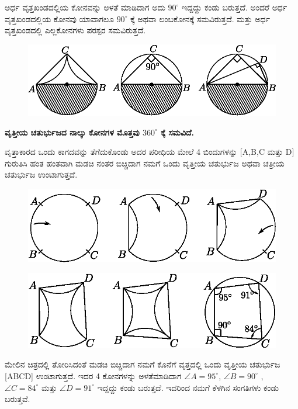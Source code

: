 \begin{itemize}
 ಅರ್ಧ  ವೃತ್ತಖಂಡದಲ್ಲಿಯ ಕೋನವನ್ನು ಅಳತೆ ಮಾಡಿದಾಗ ಅದು $90^\circ$ ಇದ್ದದ್ದು ಕಂಡು ಬರುತ್ತದೆ. ಅಂದರೆ ಅರ್ಧ ವೃತ್ತಖಂಡದಲ್ಲಿಯ ಕೋನವು ಯಾವಾಗಲೂ $90^\circ$ ಕ್ಕೆ ಅಥವಾ ಲಂಬಕೋನಕ್ಕೆ ಸಮವಿರುತ್ತದೆ. ಮತ್ತು ಅರ್ಧ ವೃತ್ತಖಂಡದಲ್ಲಿ ಎಲ್ಲಕೋನಗಳು ಪರಸ್ಪರ ಸಮವಿರುತ್ತದೆ. 
   \begin{figure}[H]
\centering
\includegraphics[scale=.98]{src/figure/chap1/fig1-31b.eps}
\end{figure}
  \end{itemize}
   
   \medskip
   \noindent
   \textbf{ವೃತ್ತೀಯ ಚತುರ್ಭುಜದ ನಾಲ್ಕು ಕೋನಗಳ ಮೊತ್ತವು $360^\circ$ ಕ್ಕೆ ಸಮವಿದೆ.}
   
   ವೃತ್ತಾಕಾರದ ಒಂದು ಕಾಗದವನ್ನು ತೆಗೆದುಕೊಂಡು ಅದರ ಪರೀಧಿಯ ಮೇಲೆ 4 ಬಿಂದುಗಳನ್ನು [A,B,C ಮತ್ತು  D] ಗುರುತಿಸಿ ಹಂತ ಹಂತವಾಗಿ ಮಡಚಿ ನಂತರ ಬಿಚ್ಚಿದಾಗ ನಮಗೆ ಒಂದು ವೃತ್ತೀಯ ಚತುರ್ಭುಜ ಅಥವಾ ಚತ್ರೀಯ ಚತುರ್ಭುಜ ಉಂಟಾಗುತ್ತದೆ. 
      \begin{figure}[H]
\centering
\includegraphics[scale=.98]{src/figure/chap1/fig1-32a.eps}
\end{figure}
      \begin{figure}[H]
\centering
\includegraphics[scale=.98]{src/figure/chap1/fig1-32b.eps}
\end{figure}
 
 ಮೇಲಿನ ಚಿತ್ರದಲ್ಲಿ ತೋರಿಸಿದಂತೆ ಮಡಚಿ ಬಿಚ್ಚಿದಾಗ ನಮಗೆ ಕೊನೆಗೆ ವೃತ್ತದಲ್ಲಿ ಒಂದು ವೃತ್ತೀಯ ಚತುರ್ಭುಜ [ABCD] ಉಂಟಾಗುತ್ತದೆ. ಇದರ 4 ಕೋನಗಳನ್ನು ಅಳತೆಮಾಡಿದಾಗ  $\angle A = 95^\circ$, $\angle B = 90^\circ$ , $\angle C = 84^\circ$ ಮತ್ತು $\angle D = 91^\circ$ ಇದ್ದದ್ದು ಕಂಡು ಬರುತ್ತದೆ. ಇದರಿಂದ ನಮಗೆ ಕೆಳಗಿನ ಸಂಗತಿಗಳು ಕಂಡು ಬರುತ್ತವೆ.
 
